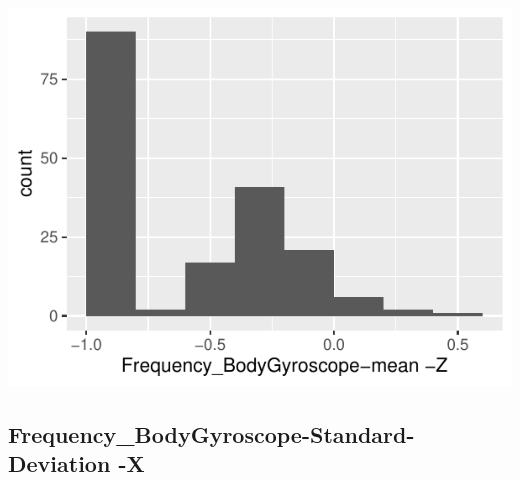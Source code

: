 \documentclass[
]{article}
\begin{document}
\begin{minipage}{0.25 \textwidth}

\includegraphics{codebook_tidydatasub_files/figure-latex/Var-63-Frequency-BodyGyroscope-mean--Z-1.pdf}

\end{minipage}

\noindent\makebox[\linewidth]{\rule{\textwidth}{0.4pt}}

\hypertarget{frequency_bodygyroscope-standard-deviation--x}{%
\subsection{Frequency\_BodyGyroscope-Standard-Deviation
-X}\label{frequency_bodygyroscope-standard-deviation--x}}
\end{document}
